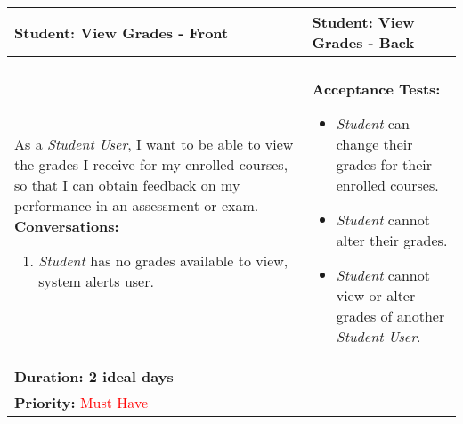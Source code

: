 \documentclass[11pt]{article}
\begin{document}
\begin{center}
\begin{tabular}{ | m{8cm}  |  m{8cm}  | } 
 \hline
 \textbf{Student: View Grades - Front} &  \textbf{Student: View Grades - Back}  \\ 
  \hline
&\\[5pt]
As a \emph{Student User}, I want to be able to view the grades I receive for my enrolled courses, so that I can obtain feedback on my performance in an assessment or exam.
\newline
\textbf{Conversations:}
\begin{enumerate}
\item{\emph{Student} has no grades available to view, system alerts user.}
\end{enumerate}
& \textbf{Acceptance Tests:} 
\begin{itemize}
\item{\emph{Student} can change their grades for their enrolled courses.}
\item{\emph{Student} cannot alter their grades.}
\item{\emph{Student} cannot view or alter grades of another \emph{Student User}.}
\end{itemize} \\
\textbf{Duration: 2 ideal days} &\\
\textbf{Priority:}  \textcolor{red}{Must Have} & \\
 \hline
\end{tabular}
\end{center}
\end{document}
